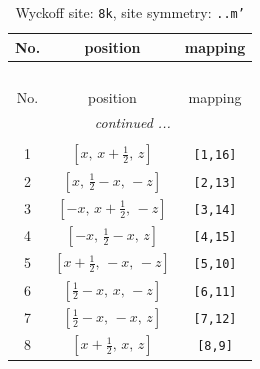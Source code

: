 \documentclass[fleqn,8pt]{jsarticle}
\begin{document}
\begin{longtable}{ccc}
\caption{Wyckoff site: {\tt 8k}, site symmetry: {\tt ..m'}}
 \\
 \hline \hline
No. & position & mapping \\ \hline \endfirsthead

\multicolumn{2}{l}{\tablename\ \thetable{}} \\
 \hline \hline
No. & position & mapping \\ \hline \endhead

 \hline \hline
\multicolumn{2}{r}{\footnotesize\it continued ...} \\ \endfoot

 \hline \hline
\multicolumn{2}{r}{} \\ \endlastfoot

1 & $\left[ x,\, x + \frac{1}{2},\, z \right]$ & {\tt [1,16]} \\ \hline
2 & $\left[ x,\, \frac{1}{2} - x,\, - z \right]$ & {\tt [2,13]} \\ \hline
3 & $\left[ - x,\, x + \frac{1}{2},\, - z \right]$ & {\tt [3,14]} \\ \hline
4 & $\left[ - x,\, \frac{1}{2} - x,\, z \right]$ & {\tt [4,15]} \\ \hline
5 & $\left[ x + \frac{1}{2},\, - x,\, - z \right]$ & {\tt [5,10]} \\ \hline
6 & $\left[ \frac{1}{2} - x,\, x,\, - z \right]$ & {\tt [6,11]} \\ \hline
7 & $\left[ \frac{1}{2} - x,\, - x,\, z \right]$ & {\tt [7,12]} \\ \hline
8 & $\left[ x + \frac{1}{2},\, x,\, z \right]$ & {\tt [8,9]} \\
\end{longtable}
\renewcommand{\arraystretch}{1.2}
\end{document}
